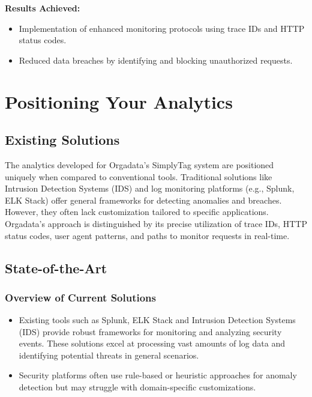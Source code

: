 \textbf{Results Achieved:}
\begin{itemize}
	\item Implementation of enhanced monitoring protocols using trace IDs and HTTP status codes.
	\item Reduced data breaches by identifying and blocking unauthorized requests.
\end{itemize}

\newpage
%
%

\chapter{Positioning Your Analytics}

\section{Existing Solutions}

The analytics developed for Orgadata’s SimplyTag system are positioned uniquely when compared to conventional tools. Traditional solutions like Intrusion Detection Systems (IDS) \cite{IEEE:2020} and log monitoring platforms (e.g., Splunk, ELK Stack) \cite{IEEE:2022} offer general frameworks for detecting anomalies and breaches. However, they often lack customization tailored to specific applications. Orgadata’s approach is distinguished by its precise utilization of trace IDs, HTTP status codes, user agent patterns, and paths to monitor requests in real-time.

\section{State-of-the-Art}

\subsection{Overview of Current Solutions}
\begin{itemize}
	\item Existing tools such as Splunk, ELK Stack and Intrusion Detection Systems (IDS) provide robust frameworks for monitoring and analyzing security events. These solutions excel at processing vast amounts of log data and identifying potential threats in general scenarios.
	\item Security platforms often use rule-based or heuristic approaches for anomaly detection but may struggle with domain-specific customizations.
\end{itemize}

